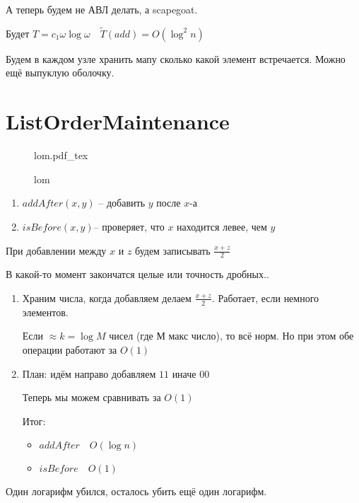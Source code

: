 \documentclass{book}
\theoremstyle{definition}
\newcommand{\tl}[1]{\widetilde{#1}}
\newcommand{\incfig}[1]{%
    \def\svgwidth{\columnwidth}
    {#1.pdf_tex}
}
\begin{document}
А теперь будем не АВЛ делать, а scapegoat.

Будет $T = c_1\omega \log \omega\quad \tl T(add) = O\left( \log ^2n \right) $

Будем в каждом узле хранить мапу сколько какой элемент встречается. Можно ещё выпуклую оболочку.
\section{ListOrderMaintenance}

\begin{figure}[!ht]
    \centering
    \incfig{lom}
    \caption{lom}
    \label{fig:lom}
\end{figure}

\begin{enumerate}
    \item $addAfter(x,y)$ -- добавить  $y$ после  $x$-а
    \item  $isBefore\left( x, y \right) $-- проверяет, что $x$ находится левее, чем  $y$
\end{enumerate}

При добавлении между $x$ и $z$ будем записывать $\frac{x+z}{2}$ 

В какой-то момент закончатся целые или точность дробных..

\begin{enumerate}
    \item Храним числа, когда добавляем делаем $\frac{x+z}{2}$. Работает, если немного элементов.

        Если $\approx k=\log M$ чисел (где М макс число), то всё норм. Но при этом обе операции работают за $O(1)$
    \item 

План: идём направо добавляем $11$ иначе  $00$ 

Теперь мы можем сравнивать за $O(1)$

Итог:
 \begin{itemize}
     \item $addAfter\quad O\left( \log n \right) $
     \item $isBefore\quad O(1)$
\end{itemize}
\end{enumerate}

Один логарифм убился, осталось убить ещё один логарифм.
\end{document}
